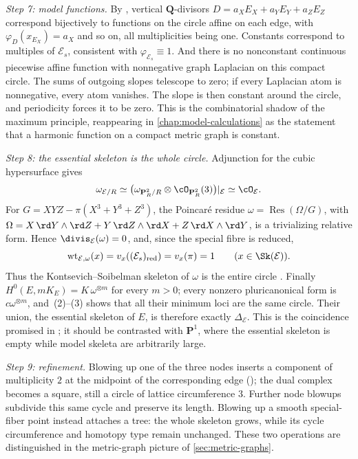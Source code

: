 \begin{example}
\emph{Step 7: model functions.} By
, vertical $\mathbf Q$-divisors
$D=a_XE_X+a_YE_Y+a_ZE_Z$ correspond bijectively to functions on the circle
affine on each edge, with $\varphi_D(x_{E_X})=a_X$ and so on, all
multiplicities being one. Constants correspond to multiples of
$\mathcal E_s$, consistent with $\varphi_{\mathcal E_s}\equiv1$. And
there is no nonconstant continuous piecewise affine function with
nonnegative graph Laplacian on this compact circle. The sums of outgoing
slopes telescope to zero; if every Laplacian atom is nonnegative, every
atom vanishes. The slope is then constant around the circle, and periodicity
forces it to be zero. This is the combinatorial shadow of the
maximum principle, reappearing in \cref{chap:model-calculations} as the
statement that a harmonic function on a compact metric graph is constant.

\emph{Step 8: the essential skeleton is the whole circle.}  Adjunction for
the cubic hypersurface gives
\[
 \omega_{\mathcal E/R}
 \simeq
 \bigl(\omega_{\mathbf P^2_R/R}\otimes\cO_{\mathbf P^2_R}(3)\bigr)
       |_{\mathcal E}
 \simeq\cO_{\mathcal E}.
\]
For $G=XYZ-\pi(X^3+Y^3+Z^3)$, the Poincaré residue
$\omega=\operatorname{Res}(\Omega/G)$, with
$\Omega=X\,\rd Y\wedge \rd Z+Y\,\rd Z\wedge \rd X+Z\,\rd X\wedge \rd Y$,
is a trivializing relative form.  Hence
$\divis_{\mathcal E}(\omega)=0$, and, since the special fibre is reduced,
\[
 \operatorname{wt}_{\mathcal E,\omega}(x)
   =v_x((\mathcal E_s)_{\mathrm{red}})=v_x(\pi)=1
 \qquad(x\in\Sk(\mathcal E)).
\]
Thus the Kontsevich--Soibelman skeleton of $\omega$ is the entire circle
\cite[Theorem~4.7.5]{MustataNicaise2015}.  Finally
$H^0(E,mK_E)=K\,\omega^{\otimes m}$ for every $m>0$; every nonzero
pluricanonical form is $c\omega^{\otimes m}$, and
\,(2)--(3) shows that all their minimum loci are
the same circle.  Their union, the essential skeleton of $E$, is therefore
exactly $\Delta_{\mathcal E}$.  This is the coincidence promised in
; it should be contrasted with $\mathbf P^1$,
where the essential skeleton is empty while model skeleta are arbitrarily
large.

\emph{Step 9: refinement.} Blowing up one of the three nodes inserts a
component of multiplicity $2$ at the midpoint of the corresponding edge
(); the dual complex becomes a square, still a
circle of lattice circumference $3$. Further node blowups subdivide this
same cycle and preserve its length. Blowing up a smooth special-fiber point
instead attaches a tree: the whole skeleton grows, while its cycle
circumference and homotopy type remain unchanged. These two operations
are distinguished in the metric-graph picture of \cref{sec:metric-graphs}.
\end{example}

